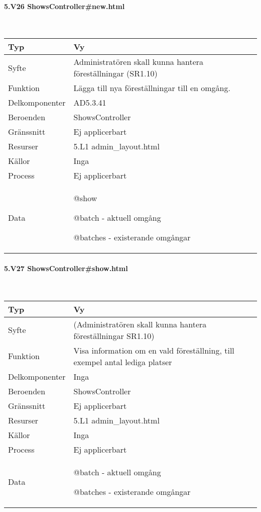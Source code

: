\documentclass[a4paper, twoside, 11pt, titlepage]{article}
\begin{document}
			\paragraph{5.V26 ShowsController\#new.html}\

			\begin {table} [ht] \begin{tabular} {  p{3.5cm} p{9.6cm} }
				\hline
				{Typ} & {Vy} \\
				\hline
				{Syfte} & {Administratören skall kunna hantera föreställningar (SR1.10)} \\
				\hline
				{Funktion} & {Lägga till nya föreställningar till en omgång.} \\
				\hline
				{Delkomponenter} & {AD5.3.41} \\
				\hline
				{Beroenden} & {ShowsController} \\
				\hline
				{Gränssnitt} & {Ej applicerbart} \\
				\hline
				{Resurser} & {5.L1 admin\_layout.html} \\
				\hline
				{Källor} & {Inga} \\
				\hline
				{Process} & {Ej applicerbart} \\
				\hline
				{Data} & {@show

@batch - aktuell omgång

@batches - existerande omgångar} \\
				\hline
			\end{tabular} \end{table} \FloatBarrier


			\paragraph{5.V27 ShowsController\#show.html}\

			\begin {table} [ht] \begin{tabular} {  p{3.5cm} p{9.6cm} }
				\hline
				{Typ} & {Vy} \\
				\hline
				{Syfte} & {(Administratören skall kunna hantera föreställningar SR1.10)} \\
				\hline
				{Funktion} & {Visa information om en vald föreställning, till exempel antal lediga platser} \\
				\hline
				{Delkomponenter} & {Inga} \\
				\hline
				{Beroenden} & {ShowsController} \\
				\hline
				{Gränssnitt} & {Ej applicerbart} \\
				\hline
				{Resurser} & {5.L1 admin\_layout.html} \\
				\hline
				{Källor} & {Inga} \\
				\hline
				{Process} & {Ej applicerbart} \\
				\hline
				{Data} & {@batch - aktuell omgång

@batches - existerande omgångar} \\
				\hline
			\end{tabular} \end{table} \FloatBarrier
\end{document}
